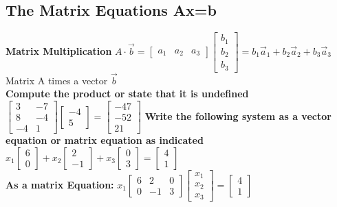 \documentclass{article}
\begin{document}
\subsection{The Matrix Equations Ax=b}
\textbf{Matrix Multiplication} $A\cdot \vec{b}= \left[\begin{array}{ccc}
    a_1&a_2&a_3
\end{array}\right]
\left[\begin{array}{c}
    b_1\\b_2\\b_3
\end{array}\right] = b_1\vec{a}_1 + b_2\vec{a}_2 + b_3\vec{a}_3$   \\Matrix A times a vector $\vec{b}$ 
\\[0.5in]\textbf{Compute the product or state that it is undefined}
$\left[\begin{array}{cc}
3&-7\\8&-4\\-4&1\end{array}\right]\left[\begin{array}{c}-4\\5
\end{array}\right] = \left[\begin{array}{c}-47\\-52\\21\end{array}\right]$
\textbf{Write the following system as a vector equation or matrix equation as indicated}
$x_1\left[\begin{array}{c}6\\0\end{array}\right]+ x_2\left[\begin{array}{c}2\\-1
\end{array}\right] + x_3 \left[\begin{array}{c}0\\3\end{array}\right] = \left[\begin{array}{c}4\\1\end{array}\right]$
\\\textbf{As a matrix Equation:}
$x_1\left[\begin{array}{ccc}6&2&0\\0&-1&3
\end{array}\right]\left[\begin{array}{c} x_1\\x_2\\x_3
\end{array}\right] = \left[\begin{array}{c}4\\1\end{array}\right]$
\end{document}
